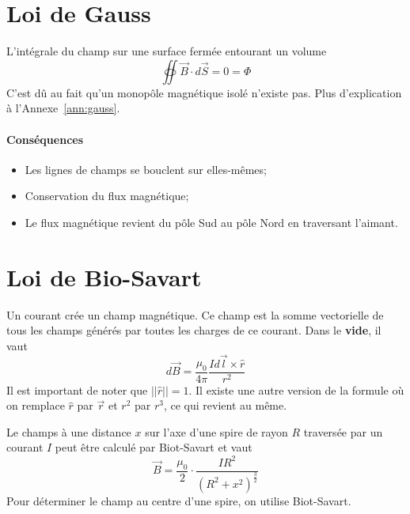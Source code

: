 \documentclass[11pt,a4paper]{article}
\newcommand{\B}{\vec B}
\begin{document}
\section{Loi de Gauss}
L'intégrale du champ sur une surface fermée entourant un volume
\[ \oiint \vec B \cdot d\vec S = 0 = \Phi \]
C'est dû au fait qu'un monopôle magnétique isolé n'existe pas.
Plus d'explication à l'Annexe~\ref{ann:gauss}.
\paragraph{Conséquences}
\begin{itemize}
	\item Les lignes de champs se bouclent sur elles-mêmes;
	\item Conservation du flux magnétique;
	\item Le flux magnétique revient du pôle Sud au pôle Nord en traversant l'aimant.
\end{itemize}

\section{Loi de Bio-Savart}
\label{sec:bs}
Un courant crée un champ magnétique.
Ce champ est la somme vectorielle de tous les champs générés par toutes les charges de ce courant.
Dans le \textbf{vide}, il vaut
\[ d\B = \frac{\mu_0}{4\pi}\frac{Id\vec l\times \hat r}{r^2} \]
Il est important de noter que $||\hat r|| = 1$.
Il existe une autre version de la formule où on remplace $\hat r$ par $\vec r$ et $r^2$ par $r^3$, ce qui revient au même.

Le champs à une distance $x$ sur l'axe d'une spire de rayon $R$ traversée par un courant $I$ peut être calculé par Biot-Savart et vaut
\[ \vec B = \frac{\mu_0}{2}\cdot\frac{IR^2}{(R^2 + x^2)^{\frac{3}{2}}} \]
Pour déterminer le champ au centre d'une spire, on utilise Biot-Savart.
\end{document}

